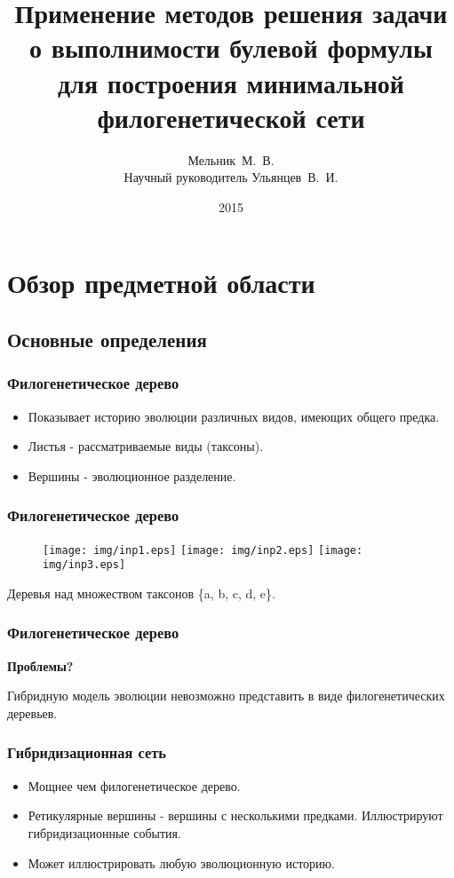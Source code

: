 \documentclass[hyperref={unicode}]{beamer}
\title{Применение методов решения задачи о выполнимости булевой формулы для построения минимальной филогенетической сети}
\author[]{Мельник~М.~В.\\
Научный руководитель Ульянцев~В.~И.}
\institute{Университет~ИТМО}
\date[]{2015}
\begin{document}
\begin{frame}
  \titlepage
\end{frame}

\section{Обзор предметной области}

\subsection{Основные определения}

\begin{frame}
\frametitle{Филогенетическое дерево}

\begin{itemize}
	\item Показывает историю эволюции различных видов, имеющих общего предка.
	\item Листья - рассматриваемые виды (таксоны).
	\item Вершины - эволюционное разделение.	
\end{itemize}

\end{frame} 


\begin{frame}
\frametitle{Филогенетическое дерево}

\centering

\begin{figure}[t]
	\texttt{[image: img/inp1.eps]}
	\hspace{5mm}
	\texttt{[image: img/inp2.eps]}
	\hspace{5mm}
	\texttt{[image: img/inp3.eps]}
\end{figure}

Деревья над множеством таксонов \{a, b, c, d, e\}.

\end{frame}

\begin{frame}
\frametitle{Филогенетическое дерево}

\textbf{Проблемы?}

Гибридную модель эволюции невозможно представить в виде филогенетических деревьев.

\end{frame}

\begin{frame}
\frametitle{Гибридизационная сеть}

\begin{itemize}
	\item Мощнее чем филогенетическое дерево.
	\item Ретикулярные вершины - вершины с несколькими предками. Иллюстрируют гибридизационные события.
	\item Может иллюстрировать любую эволюционную историю.
\end{itemize}

\end{frame}
\end{document}
